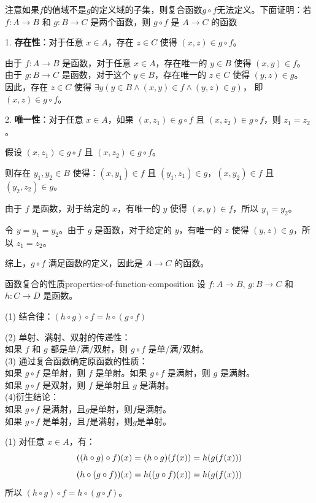 注意如果$f$的值域不是$g$的定义域的子集，则复合函数$g\circ f$无法定义。下面证明：若$f: A \to B$ 和 $g: B \to C$ 是两个函数，则 $g \circ f$ 是 $A \to C$ 的函数

1. \textbf{存在性}：对于任意 $x \in A$，存在 $z \in C$ 使得 $(x,z) \in g \circ f$。

由于 $f: A \to B$ 是函数，对于任意 $x \in A$，存在唯一的 $y \in B$ 使得 $(x,y) \in f$。
由于 $g: B \to C$ 是函数，对于这个 $y \in B$，存在唯一的 $z \in C$ 使得 $(y,z) \in g$。
因此，存在 $z \in C$ 使得 $\exists y (y \in B \land (x,y) \in f \land (y,z) \in g)$，
即 $(x,z) \in g \circ f$。

2. \textbf{唯一性}：对于任意 $x \in A$，如果 $(x,z_1) \in g \circ f$ 且 $(x,z_2) \in g \circ f$，则 $z_1 = z_2$。

假设 $(x,z_1) \in g \circ f$ 且 $(x,z_2) \in g \circ f$。

则存在 $y_1, y_2 \in B$ 使得：$(x,y_1) \in f$ 且 $(y_1,z_1) \in g$，$(x,y_2) \in f$ 且 $(y_2,z_2) \in g$。

由于 $f$ 是函数，对于给定的 $x$，有唯一的 $y$ 使得 $(x,y) \in f$，所以 $y_1 = y_2$。

令 $y = y_1 = y_2$。由于 $g$ 是函数，对于给定的 $y$，有唯一的 $z$ 使得 $(y,z) \in g$，所以 $z_1 = z_2$。

综上，$g \circ f$ 满足函数的定义，因此是 $A \to C$ 的函数。
\begin{theorem}{函数复合的性质}{properties-of-function-composition}
设 $f: A \to B$, $g: B \to C$ 和 $h: C \to D$ 是函数。

(1) 结合律：$(h \circ g) \circ f = h \circ (g \circ f)$

(2) 单射、满射、双射的传递性：\\
如果 $f$ 和 $g$ 都是单/满/双射，则 $g \circ f$ 是单/满/双射。\\
(3) 通过复合函数确定原函数的性质：\\
如果 $g \circ f$ 是单射，则 $f$ 是单射。如果 $g \circ f$ 是满射，则 $g$ 是满射。\\
如果 $g \circ f$ 是双射，则 $f$ 是单射且 $g$ 是满射。\\
(4)衍生结论：\\
如果 $g \circ f$ 是满射，且$g$是单射，则$f$是满射。 \\
如果 $g \circ f$ 是单射，且$f$是满射，则$g$是单射。
\end{theorem}
(1) 对任意 $x \in A$，有：\vspace{-10pt}
\[
((h \circ g) \circ f)(x) = (h \circ g)(f(x)) = h(g(f(x)))\vspace{-10pt}
\]
\[
(h \circ (g \circ f))(x) = h((g \circ f)(x)) = h(g(f(x)))\vspace{-10pt}
\]
所以 $(h \circ g) \circ f = h \circ (g \circ f)$。

